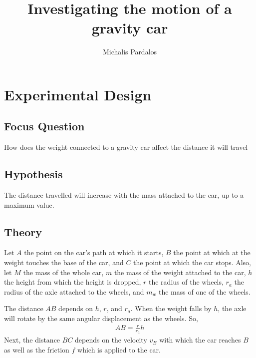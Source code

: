 \documentclass[titlepage,12pt]{article}
\title{Investigating the motion of a gravity car}
\author{Michalis Pardalos}
\date{}
\let\oldsection\section
\renewcommand\section{\FloatBarrier\oldsection}
\let\oldsubsection\subsection
\renewcommand\subsection{\FloatBarrier \oldsubsection}
\begin{document}
\maketitle
\section{Experimental Design}

\subsection{Focus Question}

How does the weight connected to a gravity car affect the distance it will travel

\subsection{Hypothesis}

The distance travelled will increase with the mass attached to the car, up to a maximum
value.

\subsection{Theory}

Let $A$ the point on the car's path at which it starts, $B$ the point at which at the weight
touches the base of the car, and $C$ the point at which the car stops. Also, let $M$ the
mass of the whole car, $m$ the mass of the weight attached to the car, $h$ the height from
which the height is dropped, $r$ the radius of the wheels, $r_a$ the radius of the axle
attached to the wheels, and $m_w$ the mass of one of the wheels.

The distance $AB$ depends on $h$, $r$, and $r_a$. When the weight falls by $h$, the axle
will rotate by the same angular displacement as the wheels. So,
%
\begin{align*}
    AB = \frac{r}{r_a} h
\end{align*}
%
Next, the distance $BC$ depends on the velocity $v_B$ with which the car reaches $B$ as well
as the friction $f$ which is applied to the car. 
\end{document}
